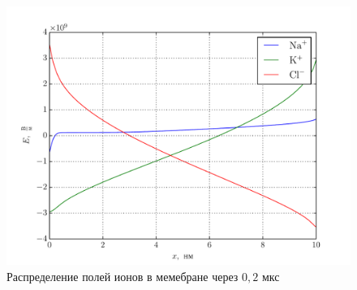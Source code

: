 \begin{figure}[h]
\begin{center}
    \includegraphics[width=\textwidth]{plots/stat_field}
\end{center}
\caption{Распределение полей ионов в мемебране через \( 0,\!2 \) мкс}
\end{figure}

